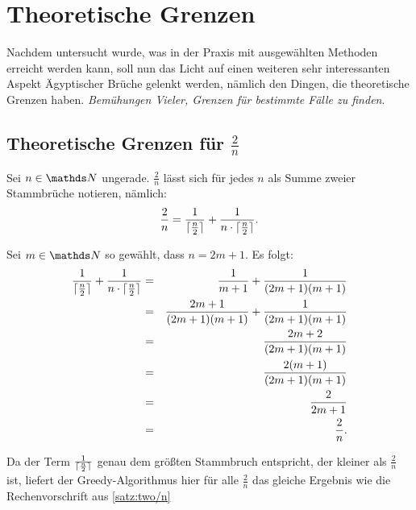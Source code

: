 \section{Theoretische Grenzen}\label{sec:theorie}
Nachdem untersucht wurde, was in der Praxis mit ausgewählten Methoden erreicht werden kann, soll nun das Licht auf einen weiteren sehr interessanten Aspekt Ägyptischer Brüche gelenkt werden, nämlich den Dingen, die theoretische Grenzen haben. \emph{Bemühungen Vieler, Grenzen für bestimmte Fälle zu finden}.

\subsection{Theoretische Grenzen für $\frac{2}{n}$}\label{subsec:two/n}
\begin{satz}\label{satz:two/n}
	Sei $n \in \N$ ungerade. $\frac{2}{n}$ lässt sich für jedes $n$ als Summe zweier Stammbrüche notieren, nämlich:
	$$\frac{2}{n} = \frac{1}{\lceil \frac{n}{2} \rceil} + \frac{1}{n \cdot \lceil \frac{n}{2} \rceil}.$$
\end{satz}
\begin{bew}
	Sei $m \in \N$ so gewählt, dass $n=2m+1$. Es folgt:
	\begin{eqnarray*}
		\frac{1}{\lceil \frac{n}{2} \rceil} + \frac{1}{n \cdot \lceil \frac{n}{2} \rceil} & = & \frac{1}{m+1} + \frac{1}{(2m+1)(m+1)}\\
		& = & \frac{2m+1}{(2m+1)(m+1)} + \frac{1}{(2m+1)(m+1)}\\
		& = & \frac{2m+2}{(2m+1)(m+1)}\\
		& = & \frac{2(m+1)}{(2m+1)(m+1)}\\
		& = & \frac{2}{2m+1}\\
		& = & \frac{2}{n}.
	\end{eqnarray*}
\end{bew}

Da der Term $\frac{1}{\lceil \frac{n}{2} \rceil}$ genau dem größten Stammbruch entspricht, der kleiner als $\frac{2}{n}$ ist, liefert der Greedy-Algorithmus hier für alle $\frac{2}{n}$ das gleiche Ergebnis wie die Rechenvorschrift aus \ref{satz:two/n}
